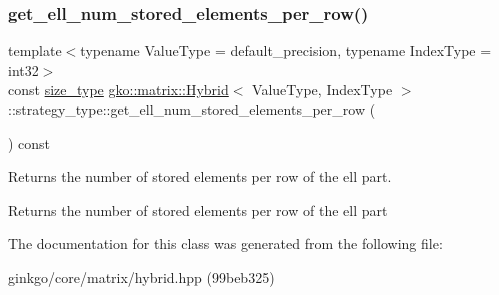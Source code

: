 \subsubsection{\texorpdfstring{get\+\_\+ell\+\_\+num\+\_\+stored\+\_\+elements\+\_\+per\+\_\+row()}{get\_ell\_num\_stored\_elements\_per\_row()}}
{\footnotesize\ttfamily template$<$typename Value\+Type = default\+\_\+precision, typename Index\+Type = int32$>$ \\
const \hyperlink{namespacegko_a6e5c95df0ae4e47aab2f604a22d98ee7}{size\+\_\+type} \hyperlink{classgko_1_1matrix_1_1Hybrid}{gko\+::matrix\+::\+Hybrid}$<$ Value\+Type, Index\+Type $>$\+::strategy\+\_\+type\+::get\+\_\+ell\+\_\+num\+\_\+stored\+\_\+elements\+\_\+per\+\_\+row (\begin{DoxyParamCaption}{ }\end{DoxyParamCaption}) const\hspace{0.3cm}{\ttfamily [noexcept]}}



Returns the number of stored elements per row of the ell part. 

\begin{DoxyReturn}{Returns}
the number of stored elements per row of the ell part 
\end{DoxyReturn}


The documentation for this class was generated from the following file\+:\begin{DoxyCompactItemize}
\item 
ginkgo/core/matrix/hybrid.\+hpp (99beb325)\end{DoxyCompactItemize}

